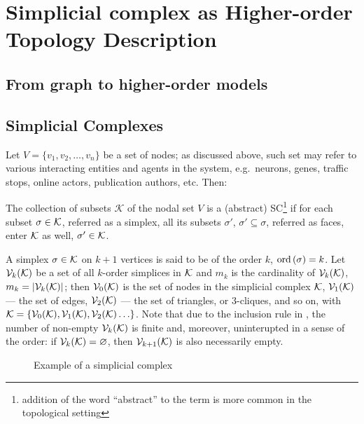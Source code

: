 \chapter{ Simplicial complex as Higher-order Topology Description } \label{chap:SC}




\section{ From graph to higher-order models } \label{sec:higher-order-models}













\section{ Simplicial Complexes } \label{sec:SCs}


Let \( V = \{ v_1, v_2, \ldots, v_n \} \) be a set of nodes; as discussed above, such set may refer to various interacting entities and agents in the system, e.g.\ neurons, genes, traffic stops, online actors, publication authors, etc. Then: 

\begin{definition}\label{def:simplicial_complex}
      The collection of subsets \( \mathcal K \) of the nodal set \( V \) is  a (abstract) {SC}\footnote{addition of the word ``abstract'' to the term is more common in the topological setting} if for each subset \( \sigma \in \mathcal{K} \), referred as a {simplex}, all its subsets \( \sigma'\), \( \sigma' \subseteq \sigma \), referred as {faces}, enter \( \mathcal{K} \) as well, \( \sigma' \in \mathcal{K}\).
\end{definition}

A simplex \( \sigma \in \mathcal{K} \) on \( k + 1 \) vertices is said to be of the order \( k \), \( \mathrm{ord}\,(\sigma) = k \). Let \( \mathcal{V}_{k}(\mathcal{K}) \) be a set of all \(k\)-order simplices in \( \mathcal{K} \) and \( m_k \) is the cardinality of \( \mathcal{V}_{k}(\mathcal{K})\), \( m_k = | \mathcal{V}_{k}(\mathcal{K}) | \); then \( \mathcal{V}_{0}(\mathcal{K}) \) is the set of nodes in the simplicial complex \( \mathcal{K} \), \( \mathcal{V}_{1}(\mathcal{K}) \) --- the set of edges, \( \mathcal{V}_{2}(\mathcal{K}) \) --- the set of triangles, or \(3\)-cliques, and so on, with \( \mathcal{K} = \{ \mathcal{V}_{0}(\mathcal{K}), \mathcal{V}_{1}(\mathcal{K}), \mathcal{V}_{2}(\mathcal{K}) \ldots \} \). Note that due to the inclusion rule in , the number of non-empty \( \mathcal{V}_{k}(\mathcal{K}) \) is finite and, moreover, uninterupted in a sense of the order: if \( \mathcal{V}_{k}(\mathcal{K}) = \varnothing \), then \( \mathcal{V}_{k+1}(\mathcal{K}) \) is also necessarily empty.
\begin{figure}[hbtp]
      \centering
      \scalebox{1.5}{}
      \caption{
            Example of a simplicial complex\label{fig:example_SC}}
\end{figure}


